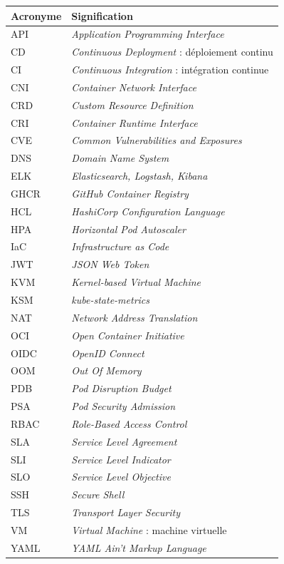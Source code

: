 \documentclass[12pt,a4paper,twoside,openright]{report}
\begin{document}
\begin{longtable}{@{}p{3.2cm}p{11.0cm}@{}}
\toprule
\textbf{Acronyme} & \textbf{Signification} \\
\midrule
\endhead
API & \emph{Application Programming Interface} \\
CD & \emph{Continuous Deployment} : déploiement continu \\
CI & \emph{Continuous Integration} : intégration continue \\
CNI & \emph{Container Network Interface} \\
CRD & \emph{Custom Resource Definition} \\
CRI & \emph{Container Runtime Interface} \\
CVE & \emph{Common Vulnerabilities and Exposures} \\
DNS & \emph{Domain Name System} \\
ELK & \emph{Elasticsearch, Logstash, Kibana} \\
GHCR & \emph{GitHub Container Registry} \\
HCL & \emph{HashiCorp Configuration Language} \\
HPA & \emph{Horizontal Pod Autoscaler} \\
IaC & \emph{Infrastructure as Code} \\
JWT & \emph{JSON Web Token} \\
KVM & \emph{Kernel-based Virtual Machine} \\
KSM & \emph{kube-state-metrics} \\
NAT & \emph{Network Address Translation} \\
OCI & \emph{Open Container Initiative} \\
OIDC & \emph{OpenID Connect} \\
OOM & \emph{Out Of Memory} \\
PDB & \emph{Pod Disruption Budget} \\
PSA & \emph{Pod Security Admission} \\
RBAC & \emph{Role-Based Access Control} \\
SLA & \emph{Service Level Agreement} \\
SLI & \emph{Service Level Indicator} \\
SLO & \emph{Service Level Objective} \\
SSH & \emph{Secure Shell} \\
TLS & \emph{Transport Layer Security} \\
VM & \emph{Virtual Machine} : machine virtuelle \\
YAML & \emph{YAML Ain't Markup Language} \\
\bottomrule
\end{longtable}
\end{document}
